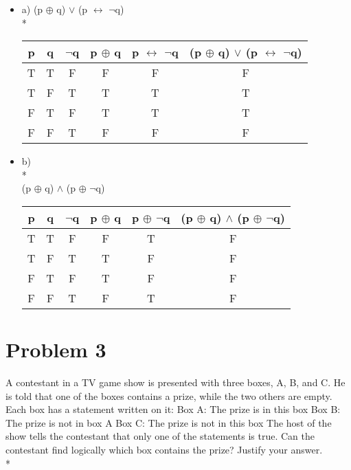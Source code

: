 \documentclass[11pt]{article}
\begin{document}
	\begin{itemize}
	\item [] a)
	(p $\oplus$ q) $\vee$ (p $\leftrightarrow$ $\neg$q)\\*\\
		
		\begin{center}
			\begin{tabular}{||c | c | c | c | c | c||}
				\hline
				p & q & $\neg$q & p $\oplus$ q & p $\leftrightarrow$ $\neg$q & (p $\oplus$ q) $\vee$ (p $\leftrightarrow$ $\neg$q)\\
				[0.5ex]
				\hline\hline
				T & T & F & F & F & F\\
				\hline
				T & F & T & T & T & T\\
				\hline
				F & T & F & T & T & T\\
				\hline
				F & F & T & F & F & F\\
				\hline
			\end{tabular}
		\end{center}
	\item [] b)\\*\\
	(p $\oplus$ q) $\wedge$ (p $\oplus$ $\neg$q)
	
		\begin{center}
			\begin{tabular}{||c c c c c c||}					\hline
				p & q & $\neg$q & p $\oplus$ q & p $\oplus$ $\neg$q & (p $\oplus$ q) $\wedge$ (p $\oplus$ $\neg$q)\\
				[0.5ex]
				\hline\hline
				T & T & F & F & T & F\\
				\hline		
				T & F & T & T & F & F\\
				\hline
				F & T & F & T & F & F\\
				\hline
				F & F & T & F & T & F\\
				\hline			
			\end{tabular}
		\end{center}
	

	
	\end{itemize}
	
	\newpage
	\section*{Problem 3} 
	
	A contestant in a TV game show is presented with three boxes, A, B, and C. He is told
	that one of the boxes contains a prize, while the two others are empty. Each box has a
	statement written on it:
	Box A: The prize is in this box
	Box B: The prize is not in box A
	Box C: The prize is not in this box
	The host of the show tells the contestant that only one of the statements is true. Can the
	contestant find logically which box contains the prize? Justify your answer.\\*\\
	
\end{document}
